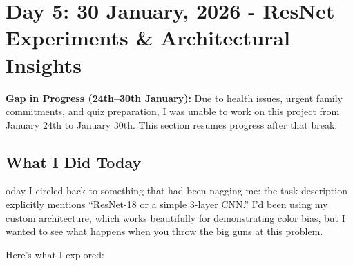 \documentclass[9pt,a4paper,twocolumn,twoside]{tau-class/tau}
\begin{document}

\section{Day 5: 30 January, 2026 - ResNet Experiments \& Architectural Insights}

    \begin{note}
        \textbf{Gap in Progress (24th--30th January):} Due to health issues, urgent family commitments, and quiz preparation, I was unable to work on this project from January 24th to January 30th. This section resumes progress after that break.
    \end{note}

    \subsection{What I Did Today}

        oday I circled back to something that had been nagging me: the task description explicitly mentions ``ResNet-18 or a simple 3-layer CNN.'' I'd been using my custom  architecture, which works beautifully for demonstrating color bias, but I wanted to see what happens when you throw the big guns at this problem.

        Here's what I explored:
\end{document}
